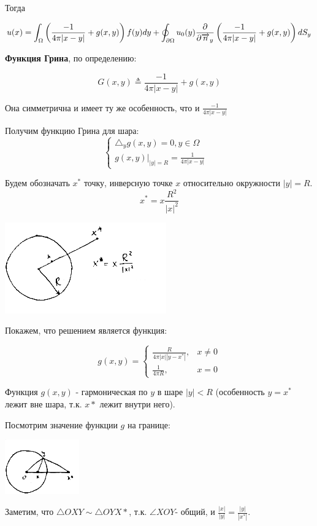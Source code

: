 Тогда

$$u(x) = \int_{\Omega} {\left(\frac{-1}{4 \pi |x-y|} +g(x,y)\right) f(y) dy} + \oint_{\partial \Omega} {u_0(y) \frac{\partial}{\partial \overrightarrow{n}_y} \left(\frac{-1}{4 \pi |x-y|}+g(x,y)\right)dS_y}
$$

\textbf{Функция Грина}, по определению:

$$G(x,y) \triangleq  \frac{-1}{4 \pi |x-y|} + g(x,y) $$

Она симметрична и имеет ту же особенность, что и $\frac{-1}{4 \pi |x-y|}$







Получим функцию Грина для шара:
\[\begin{cases}
   \triangle_y g(x,y) = 0, y \in \Omega \\
   g(x,y)|_{|y|=R} = \frac{1}{4 \pi |x-y|}& 
\end{cases}\]  

Будем обозначать $x^*$ точку, инверсную точке $x$ относительно окружности $|y|=R$.
$$x^* = x \frac{R^2}{|x|^2}$$
\begin{center}
\includegraphics{20_1_new}
\end{center}
Покажем, что решением является функция:

\[g(x,y) = \begin{cases}
   \frac{R}{4 \pi |x| |y-x^*|},   & x \ne 0 \\
   \frac{1}{4 \pi R},& x=0
\end{cases}\]

Функция $g(x,y)$ - гармоническая по $y$ в шаре $|y|<R$ (особенность $y=x^*$ лежит вне шара, т.к. $x*$ лежит внутри него).

Посмотрим значение функции $g$ на границе:
\begin{center}
\includegraphics{20_2_new}
\end{center}
Заметим, что $\triangle OXY \sim \triangle OYX*$, т.к. $\angle XOY$- общий, и $\frac{|x|}{|y|}  =\frac{|y|}{|x^*|}$.

